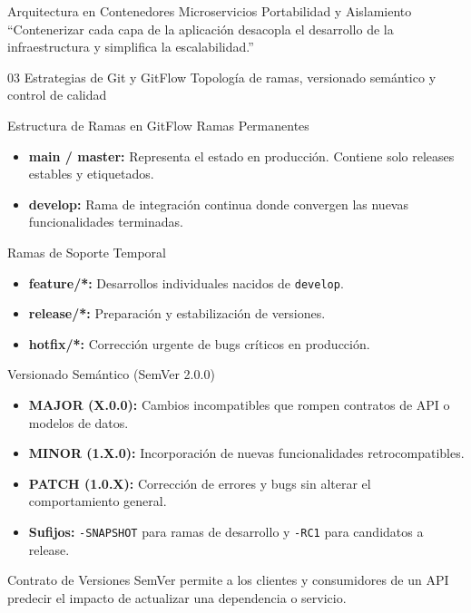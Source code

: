 \documentclass[aspectratio=169]{beamer}
\begin{document}
\contentSlideQuoteStat
  {Arquitectura en Contenedores}
  {Microservicios}
  {Portabilidad y Aislamiento}
  {“Contenerizar cada capa de la aplicación desacopla el desarrollo de la infraestructura y simplifica la escalabilidad.”}

\sectionSlideStripe
  {03}
  {Estrategias de Git y GitFlow}
  {Topología de ramas, versionado semántico y control de calidad}

\contentSlideTwoCols
  {Estructura de Ramas en GitFlow}
  {Ramas Permanentes}
  {
    \begin{itemize}
      \item \textbf{main / master:} Representa el estado en producción. Contiene solo releases estables y etiquetados.
      \item \textbf{develop:} Rama de integración continua donde convergen las nuevas funcionalidades terminadas.
    \end{itemize}
  }
  {Ramas de Soporte Temporal}
  {
    \begin{itemize}
      \item \textbf{feature/*:} Desarrollos individuales nacidos de \texttt{develop}.
      \item \textbf{release/*:} Preparación y estabilización de versiones.
      \item \textbf{hotfix/*:} Corrección urgente de bugs críticos en producción.
    \end{itemize}
  }

\contentSlideBulletCard
  {Versionado Semántico (SemVer 2.0.0)}
  {
    \begin{itemize}
      \item \textbf{MAJOR (X.0.0):} Cambios incompatibles que rompen contratos de API o modelos de datos.
      \item \textbf{MINOR (1.X.0):} Incorporación de nuevas funcionalidades retrocompatibles.
      \item \textbf{PATCH (1.0.X):} Corrección de errores y bugs sin alterar el comportamiento general.
      \item \textbf{Sufijos:} \texttt{-SNAPSHOT} para ramas de desarrollo y \texttt{-RC1} para candidatos a release.
    \end{itemize}
  }
  {Contrato de Versiones}
  {SemVer permite a los clientes y consumidores de un API predecir el impacto de actualizar una dependencia o servicio.}
\end{document}

